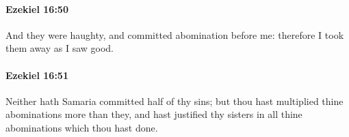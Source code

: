 		\paragraph{Ezekiel 16:50} %
			\label{EZEKIEL-16-50}

			And they were haughty, and committed abomination before me: therefore I took them away as I saw good.


		\paragraph{Ezekiel 16:51} %
			\label{EZEKIEL-16-51}

			Neither hath Samaria committed half of thy sins; but thou hast multiplied thine abominations more than they, and hast justified thy sisters in all thine abominations which thou hast done.


